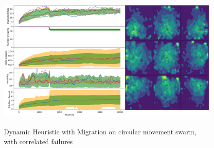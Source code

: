 \documentclass{UoYCSproject}
\begin{document}
\begin{figure}[htb]
\label{fig:circle_movement_con3}
\begin{center}
\centering
\includegraphics[height=7cm]{"./Dynamic_Migration/Circle_Move_con.png"}
\caption{Dynamic Heuristic with Migration on circular movement swarm, with correlated failures}
\end{center}
\end{figure}

\end{document}
